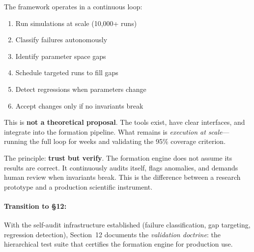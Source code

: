\documentclass[11pt]{article}
\begin{document}
The framework operates in a continuous loop:
\begin{enumerate}
\item Run simulations at scale (10,000+ runs)
\item Classify failures autonomously
\item Identify parameter space gaps
\item Schedule targeted runs to fill gaps
\item Detect regressions when parameters change
\item Accept changes only if no invariants break
\end{enumerate}

This is \textbf{not a theoretical proposal}. The tools exist, have clear interfaces, and integrate into the formation pipeline. What remains is \textit{execution at scale}---running the full loop for weeks and validating the 95\% coverage criterion.

The principle: \textbf{trust but verify}. The formation engine does not assume its results are correct. It continuously audits itself, flags anomalies, and demands human review when invariants break. This is the difference between a research prototype and a production scientific instrument.

\paragraph{Transition to \S12:} With the self-audit infrastructure established (failure classification, gap targeting, regression detection), Section~12 documents the \textit{validation doctrine}: the hierarchical test suite that certifies the formation engine for production use.
\end{document}
